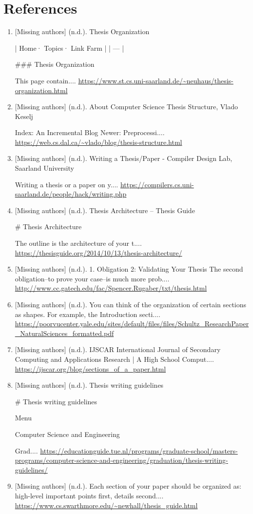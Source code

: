\documentclass{article}
\begin{document}
\section*{References}
\begin{enumerate}
\item \label{ref:1} {[}Missing authors{]} (n.d.). Thesis Organization

| Home· Topics· Link Farm |
| --- |

\#\#\# Thesis Organization

This page contain.... \url{https://www.st.cs.uni-saarland.de/~neuhaus/thesis-organization.html}
\item \label{ref:2} {[}Missing authors{]} (n.d.). About Computer Science Thesis Structure, Vlado Keselj

Index: An Incremental Blog Newer: Preprocessi.... \url{https://web.cs.dal.ca/~vlado/blog/thesis-structure.html}
\item \label{ref:3} {[}Missing authors{]} (n.d.). Writing a Thesis/Paper - Compiler Design Lab, Saarland University 

Writing a thesis or a paper on y.... \url{https://compilers.cs.uni-saarland.de/people/hack/writing.php}
\item \label{ref:4} {[}Missing authors{]} (n.d.). Thesis Architecture -- Thesis Guide

\# Thesis Architecture

The outline is the architecture of your t.... \url{https://thesisguide.org/2014/10/13/thesis-architecture/}
\item \label{ref:5} {[}Missing authors{]} (n.d.). 1. Obligation 2: Validating Your Thesis The second obligation--to prove your case--is much more prob.... \url{http://www.cc.gatech.edu/fac/Spencer.Rugaber/txt/thesis.html}
\item \label{ref:6} {[}Missing authors{]} (n.d.). You can think of the organization of certain sections as shapes. For example, the Introduction secti.... \url{https://poorvucenter.yale.edu/sites/default/files/files/Schultz_ResearchPaper_NaturalSciences_formatted.pdf}
\item \label{ref:7} {[}Missing authors{]} (n.d.). IJSCAR International Journal of Secondary Computing and Applications Research | A High School Comput.... \url{https://ijscar.org/blog/sections_of_a_paper.html}
\item \label{ref:8} {[}Missing authors{]} (n.d.). Thesis writing guidelines

\# Thesis writing guidelines

Menu

Computer Science and Engineering

Grad.... \url{https://educationguide.tue.nl/programs/graduate-school/masters-programs/computer-science-and-engineering/graduation/thesis-writing-guidelines/}
\item \label{ref:9} {[}Missing authors{]} (n.d.). Each section of your paper should be organized as: high-level important points first, details second.... \url{https://www.cs.swarthmore.edu/~newhall/thesis_guide.html}
\end{enumerate}
\end{document}
